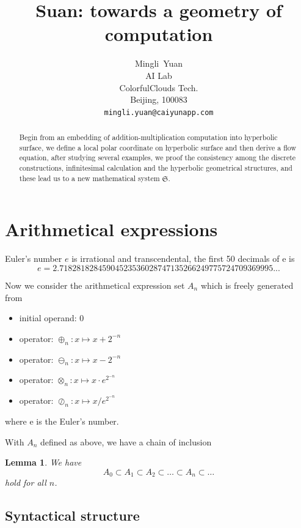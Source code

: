 \documentclass{article}
\title{Suan: towards a geometry of computation}
\author{
  Mingli~Yuan \\
  AI Lab \\
  ColorfulClouds Tech.\\
  Beijing, 100083 \\
  \texttt{mingli.yuan@caiyunapp.com} \\
}
\newtheorem{lemma}{Lemma}
\begin{document}
\maketitle

\begin{abstract}
    Begin from an embedding of addition-multiplication computation into hyperbolic surface, we define a local polar
    coordinate on hyperbolic surface and then derive a flow equation, after studying several examples, we proof the
    consistency among the discrete constructions, infinitesimal calculation and the hyperbolic geometrical structures, and
    these lead us to a new mathematical system $\mathfrak{S}$.
\end{abstract}


\setcounter{tocdepth}{2}
\tableofcontents

\section{Arithmetical expressions}\label{sec:expressions}

Euler's number $e$ is irrational and transcendental, the first 50 decimals of e is
$$
e = 2.71828182845904523536028747135266249775724709369995...
$$

Now we consider the arithmetical expression set $A_n$ which is freely generated from
\begin{itemize}
    \item initial operand: $0$
    \item operator: $\oplus_n: x \mapsto x + 2^{-n}$
    \item operator: $\ominus_n: x \mapsto x - 2^{-n}$
    \item operator: $\otimes_n: x \mapsto x \cdot e^{2^{-n}}$
    \item operator: $\oslash_n: x \mapsto x / e^{2^{-n}}$
\end{itemize}
where e is the Euler's number.

With $A_n$ defined as above, we have a chain of inclusion
\begin{lemma}
\label{lemma:chainofinclusion1}
We have
$$ A_0 \subset A_1 \subset A_2 \subset \ldots \subset A_n \subset \ldots $$
hold for all $n$.
\end{lemma}

\subsection{Syntactical structure}\label{sec:syntactical}
\end{document}
